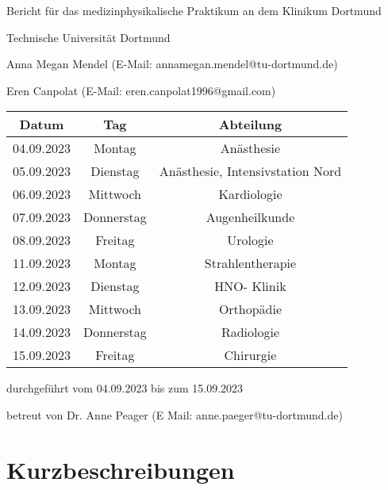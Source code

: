 \documentclass[11pt,a4paper,titlepage]{scrartcl}
\begin{document}
\begin{titlepage}
	\centering
	{\LARGE Bericht für das medizinphysikalische Praktikum an dem Klinikum Dortmund\par}
	\vspace{1.0cm}
	{\huge   \par}
	\vspace{2.5cm}
	{\LARGE Technische Universität Dortmund \par}
	\vspace{0.5cm}
	{\large Anna Megan Mendel (E-Mail:  annamegan.mendel@tu-dortmund.de) \par}
	{\large Eren Canpolat (E-Mail: eren.canpolat1996@gmail.com) \par}
    \vspace{2cm}
	\begin{tabular}{|c|c|c|}
    \hline
    Datum & Tag & Abteilung \\ \hline
    04.09.2023 & Montag & Anästhesie \\ \hline
    05.09.2023 & Dienstag & Anästhesie, Intensivstation Nord \\ \hline
    06.09.2023 & Mittwoch & Kardiologie \\ \hline
    07.09.2023 & Donnerstag & Augenheilkunde \\ \hline
    08.09.2023 & Freitag & Urologie \\ \hline
    11.09.2023 & Montag & Strahlentherapie \\ \hline
    12.09.2023 & Dienstag & HNO- Klinik \\ \hline
    13.09.2023 & Mittwoch & Orthopädie \\ \hline
    14.09.2023 & Donnerstag & Radiologie \\ \hline
    15.09.2023 & Freitag & Chirurgie \\ \hline
\end{tabular}
	\vfill
	durchgeführt vom 04.09.2023 bis zum 15.09.2023\par
	betreut von Dr. Anne Peager (E Mail: anne.paeger@tu-dortmund.de)\par
	
\end{titlepage}	
	
\tableofcontents

\newpage



\newpage

\section{Kurzbeschreibungen}
\end{document}
